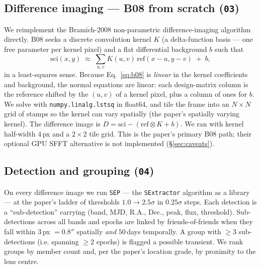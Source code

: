 \documentclass[11pt,letterpaper]{article}
\begin{document}
\subsection{Difference imaging --- B08 from scratch (\texttt{03})}
We reimplement the Bramich-2008 \autocite{bramich2008} non-parametric
difference-imaging algorithm directly. B08 seeks a discrete convolution
kernel $K$ (a delta-function basis --- one free parameter per kernel pixel)
and a flat differential background $b$ such that
\begin{equation}
\mathrm{sci}(x,y) \;\approx\; \sum_{u,v} K(u,v)\,\mathrm{ref}(x-u,y-v) \;+\; b ,
\label{eq:b08}
\end{equation}
in a least-squares sense. Because Eq.~\eqref{eq:b08} is \emph{linear} in the
kernel coefficients and background, the normal equations are linear: each
design-matrix column is the reference shifted by the $(u,v)$ of a kernel
pixel, plus a column of ones for $b$. We solve with \texttt{numpy.linalg.lstsq}
in float64, and tile the frame into an $N\times N$ grid of stamps so the
kernel can vary spatially (the paper's spatially varying kernel). The
difference image is $D = \mathrm{sci} - (\mathrm{ref}\!\otimes\!K + b)$. We
ran with kernel half-width $4$\,px and a $2\times2$ tile grid. This is the
paper's primary B08 path; their optional GPU SFFT
\autocite{hu2022sfft} alternative is not implemented (\S\ref{sec:caveats}).

\subsection{Detection and grouping (\texttt{04})}
On every difference image we run \texttt{SEP} \autocite{barbary2016sep} ---
the \texttt{SExtractor} algorithm \autocite{bertin1996sextractor} as a
library --- at the paper's ladder of thresholds $1.0\to2.5\sigma$ in
$0.25\sigma$ steps. Each detection is a ``sub-detection'' carrying
(band, MJD, R.A., Dec., peak, flux, threshold). Sub-detections across all
bands and epochs are linked by friends-of-friends when they fall within
$3$\,px $=0.8''$ spatially \emph{and} $50$\,days temporally. A group with
$\geq3$ sub-detections (i.e. spanning $\geq2$ epochs) is flagged a possible
transient. We rank groups by member count and, per the paper's location
grade, by proximity to the lens centre.
\end{document}
